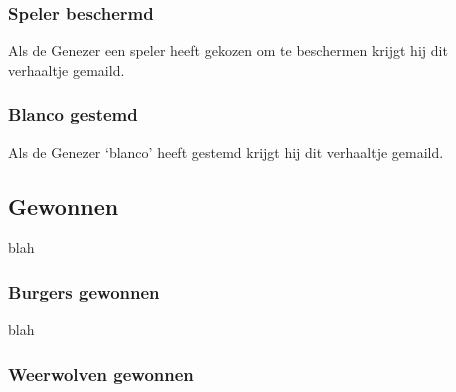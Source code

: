 \documentclass[12pt]{article}
\begin{document}
    \subsubsection{Speler beschermd}
    
      Als de Genezer een speler heeft gekozen om te beschermen krijgt hij dit verhaaltje gemaild.
    
      \begin{center}
      \end{center}
    
    \subsubsection{Blanco gestemd}
    
      Als de Genezer `blanco' heeft gestemd krijgt hij dit verhaaltje gemaild.
    
      \begin{center}
      \end{center}
  
  \subsection{Gewonnen}
    
      blah
  
    \subsubsection{Burgers gewonnen}
    
      blah
    
    \subsubsection{Weerwolven gewonnen}
    
\end{document}
